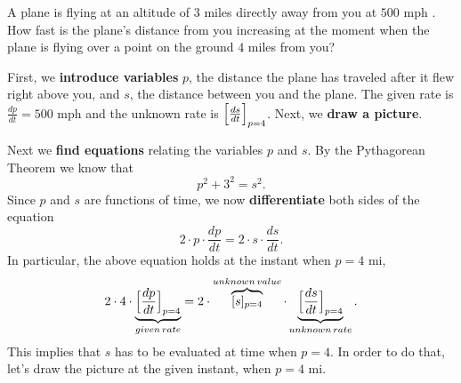 \documentclass{ximera}
\begin{document}
\begin{example}
A plane is flying at an altitude of $3$ miles directly away from you at $500$ mph 
.  How fast is the plane's distance from you increasing at
the moment when the plane is flying over a point on the ground $4$
miles from you?


\begin{explanation}
 First, we \textbf{introduce variables} $p$, the distance the plane has traveled after  it flew right above you, and $s$, the distance between you and the plane. 
The given rate is $\frac{dp}{dt}=500$ mph and the unknown rate is $\Bigl [\frac{ds}{dt}\Bigr]_{p=4}$.
Next, we \textbf{draw a picture}.
\begin{image}
\end{image}
Next we \textbf{find equations} relating the variables $p$ and $s$. By the Pythagorean Theorem
we know that
\[
p^2+3^2=s^2.
\] 
Since  $p$ and $s$ are functions of time, we now
\textbf{differentiate} both sides of the equation 
\[
2\cdot p\cdot \frac{dp}{dt}  = 2\cdot s \cdot \frac{ds}{dt}.
\] 
In particular, the above equation holds at the instant when  $p=4$ mi,
\[
2\cdot4\cdot\underbrace{ \Bigl[\frac{dp}{dt}\Bigr]_{p=4}}_{given\hspace{0.02in}rate}  = 2\cdot \overbrace{[s]_{p=4}}^{unknown\hspace{0.02in}value} \cdot \underbrace{\Bigl[\frac{ds}{dt}\Bigr]_{p=4}}_{unknown\hspace{0.02in}rate} .
\] 
 This implies that $s$ has to be evaluated at time when $p=4$. In order to do that,
 let's draw the picture at the given instant, when $p=4$ mi.

\end{explanation}
\end{example}
\end{document}
